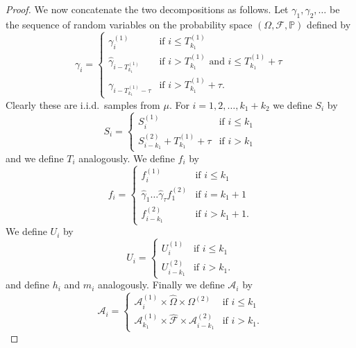 \documentclass[10pt,a4paper]{amsart}
\begin{document}
\begin{proof}
    We now concatenate the two decompositions as follows. Let $\gamma_1, \gamma_2, \dots$ be the sequence of random variables on the probability space $\left(\Omega, \mathscr{F}, \mathbb{P}\right)$ defined by $$\gamma_i = \begin{cases}
        \gamma_i^{(1)} & \text{if } i \leq T^{(1)}_{k_1} \\
        \hat{\gamma}_{i - T^{(1)}_{k_1}} & \text{if } i > T^{(1)}_{k_1} \text{ and } i \leq T^{(1)}_{k_1} + \tau \\
        \gamma_{i - T^{(1)}_{k_1} - \tau} & \text{if } i > T^{(1)}_{k_1} + \tau.
    \end{cases}$$
    Clearly these are i.i.d.\ samples from $\mu$. For $i = 1, 2, \dots, k_1 + k_2$ we define $S_i$ by
    \begin{equation*}
        S_i =
        \begin{cases}
            S_i^{(1)} & \text{if } i \leq k_1\\
            S_{i-k_1}^{(2)} + T^{(1)}_{k_1} + \tau & \text{if } i > k_1
        \end{cases}
    \end{equation*}
    and we define $T_i$ analogously. We define $f_i$ by
    \begin{equation*}
        f_i =
        \begin{cases}
            f_i^{(1)} & \text{if } i \leq k_1\\
            \hat{\gamma}_1 \dots \hat{\gamma}_{\tau} f_{1}^{(2)} & \text{if } i = k_1 + 1 \\
            f_{i-k_1}^{(2)} & \text{if } i > k_1 + 1.
        \end{cases}
    \end{equation*}
    We define $U_i$ by
    \begin{equation*}
        U_i =
        \begin{cases}
            U_i^{(1)} & \text{if } i \leq k_1\\
            U_{i-k_1}^{(2)} & \text{if } i > k_1.
        \end{cases}
    \end{equation*}
    and define $h_i$ and $m_i$ analogously. Finally we define $\mathscr{A}_i$ by
    \begin{equation*}
        \mathscr{A}_i =
        \begin{cases}
            \mathscr{A}_i^{(1)} \times \hat{\Omega} \times \Omega^{(2)} & \text{if } i \leq k_1\\
            \mathscr{A}_{k_1}^{(1)} \times \hat{\mathscr{F}} \times \mathscr{A}_{i-k_1}^{(2)} & \text{if } i > k_1.

\end{cases}
\end{equation*}
\end{proof}
\end{document}
